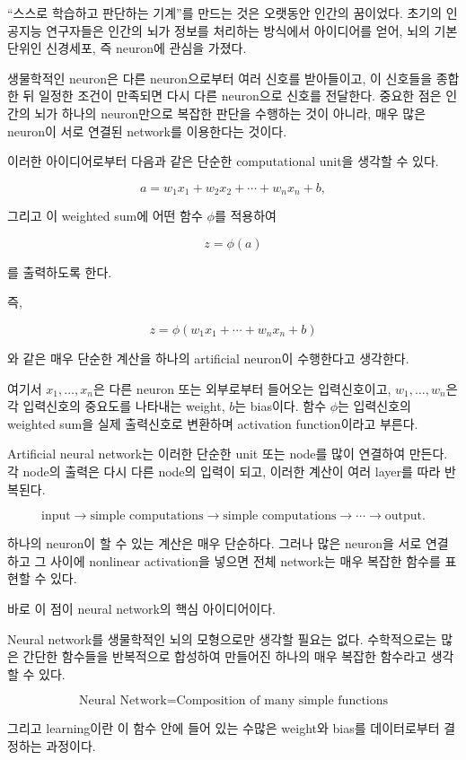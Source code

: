 \documentclass[11pt,a4paper]{article}
\begin{document}
``스스로 학습하고 판단하는 기계''를 만드는 것은 오랫동안 인간의 꿈이었다.
초기의 인공지능 연구자들은 인간의 뇌가 정보를 처리하는 방식에서 아이디어를 얻어,
뇌의 기본 단위인 신경세포, 즉 neuron에 관심을 가졌다.

생물학적인 neuron은 다른 neuron으로부터 여러 신호를 받아들이고,
이 신호들을 종합한 뒤 일정한 조건이 만족되면 다시 다른 neuron으로
신호를 전달한다.
중요한 점은 인간의 뇌가 하나의 neuron만으로 복잡한 판단을 수행하는 것이 아니라,
매우 많은 neuron이 서로 연결된 network를 이용한다는 것이다.

이러한 아이디어로부터 다음과 같은 단순한 computational unit을 생각할 수 있다.

\[
a=w_1x_1+w_2x_2+\cdots+w_nx_n+b,
\]

그리고 이 weighted sum에 어떤 함수 $\phi$를 적용하여

\[
z=\phi(a)
\]

를 출력하도록 한다.

즉,

\[
\boxed{
z=
\phi\!\left(
w_1x_1+\cdots+w_nx_n+b
\right)
}
\]

와 같은 매우 단순한 계산을 하나의 artificial neuron이 수행한다고 생각한다.

여기서 $x_1,\ldots,x_n$은 다른 neuron 또는 외부로부터 들어오는 입력신호이고,
$w_1,\ldots,w_n$은 각 입력신호의 중요도를 나타내는 weight,
$b$는 bias이다.
함수 $\phi$는 입력신호의 weighted sum을 실제 출력신호로 변환하며
activation function이라고 부른다.

Artificial neural network는 이러한 단순한 unit 또는 node를
많이 연결하여 만든다.
각 node의 출력은 다시 다른 node의 입력이 되고,
이러한 계산이 여러 layer를 따라 반복된다.

\[
\text{input}
\longrightarrow
\text{simple computations}
\longrightarrow
\text{simple computations}
\longrightarrow
\cdots
\longrightarrow
\text{output}.
\]

하나의 neuron이 할 수 있는 계산은 매우 단순하다.
그러나 많은 neuron을 서로 연결하고 그 사이에 nonlinear activation을 넣으면
전체 network는 매우 복잡한 함수를 표현할 수 있다.

바로 이 점이 neural network의 핵심 아이디어이다.

\begin{keybox}
Neural network를 생물학적인 뇌의 모형으로만 생각할 필요는 없다.
수학적으로는 많은 간단한 함수들을 반복적으로 합성하여 만들어진
하나의 매우 복잡한 함수라고 생각할 수 있다.

\[
\boxed{
\text{Neural Network}
=
\text{Composition of many simple functions}
}
\]

그리고 learning이란 이 함수 안에 들어 있는 수많은 weight와 bias를
데이터로부터 결정하는 과정이다.
\end{keybox}
\end{document}
